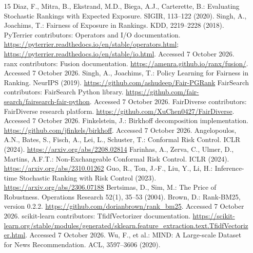\documentclass[runningheads]{llncs}
\begin{document}
\clearpage
\begin{thebibliography}{15}
 Diaz, F., Mitra, B., Ekstrand, M.D., Biega, A.J., Carterette, B.:
Evaluating Stochastic Rankings with Expected Exposure. SIGIR, 113--122 (2020).
 Singh, A., Joachims, T.: Fairness of Exposure in Rankings.
KDD, 2219--2228 (2018). 
 PyTerrier contributors: Operators and I/O documentation.
\url{https://pyterrier.readthedocs.io/en/stable/operators.html};
\url{https://pyterrier.readthedocs.io/en/stable/io.html}. Accessed 7 October 2026.
 ranx contributors: Fusion documentation.
\url{https://amenra.github.io/ranx/fusion/}. Accessed 7 October 2026.
 Singh, A., Joachims, T.: Policy Learning for Fairness in Ranking.
NeurIPS (2019). \url{https://github.com/ashudeep/Fair-PGRank}
 FairSearch contributors: FairSearch Python library.
\url{https://github.com/fair-search/fairsearch-fair-python}. Accessed 7 October 2026.
 FairDiverse contributors: FairDiverse research platform.
\url{https://github.com/XuChen0427/FairDiverse}. Accessed 7 October 2026.
 Finkelstein, J.: Birkhoff decomposition implementation.
\url{https://github.com/jfinkels/birkhoff}. Accessed 7 October 2026.
 Angelopoulos, A.N., Bates, S., Fisch, A., Lei, L., Schuster, T.:
Conformal Risk Control. ICLR (2024). \url{https://arxiv.org/abs/2208.02814}
 Farinhas, A., Zerva, C., Ulmer, D., Martins, A.F.T.:
Non-Exchangeable Conformal Risk Control. ICLR (2024).
\url{https://arxiv.org/abs/2310.01262}
 Guo, R., Ton, J.-F., Liu, Y., Li, H.:
Inference-time Stochastic Ranking with Risk Control (2023).
\url{https://arxiv.org/abs/2306.07188}
 Bertsimas, D., Sim, M.: The Price of Robustness.
Operations Research 52(1), 35--53 (2004). 
 Brown, D.: Rank-BM25, version 0.2.2.
\url{https://github.com/dorianbrown/rank_bm25}. Accessed 7 October 2026.
 scikit-learn contributors: TfidfVectorizer documentation.
\url{https://scikit-learn.org/stable/modules/generated/sklearn.feature_extraction.text.TfidfVectorizer.html}.
Accessed 7 October 2026.
 Wu, F., et al.: MIND: A Large-scale Dataset for News Recommendation.
ACL, 3597--3606 (2020). 
\end{thebibliography}
\end{document}
